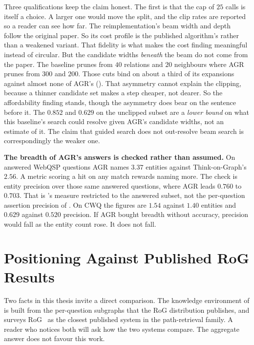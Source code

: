 Three qualifications keep the claim honest. The first is that the cap of $25$
calls is itself a choice. A larger one would move the split, and the clip rates
are reported so a reader can see how far. The reimplementation's beam width and
depth follow the original paper. So its cost profile is the published
algorithm's rather than a weakened variant. That fidelity is what makes the cost
finding meaningful instead of circular. But the candidate widths \emph{beneath}
the beam do not come from the paper. The baseline prunes from $40$ relations and
$20$ neighbours where AGR prunes from $300$ and $200$. Those cuts bind on about
a third of its expansions against almost none of AGR's
(). That asymmetry cannot explain the clipping, because a
thinner candidate set makes a step cheaper, not dearer. So the affordability
finding stands, though the asymmetry does bear on the sentence before it. The
$0.852$ and $0.629$ on the unclipped subset are a \emph{lower bound} on what
this baseline's search could resolve given AGR's candidate widths, not an
estimate of it. The claim that guided search does not out-resolve beam search is
correspondingly the weaker one.

\textbf{The breadth of AGR's answers is checked rather than assumed.} On
answered WebQSP questions AGR names $3.37$ entities against Think-on-Graph's
$2.56$. A metric scoring a hit on any match rewards naming more. The check is
entity precision over those same answered questions, where AGR leads $0.760$ to
$0.703$. That is 's measure restricted to the answered subset,
not the per-question assertion precision of . On CWQ the
figures are $1.54$ against $1.40$ entities and $0.629$ against $0.520$
precision. If AGR bought breadth without accuracy, precision would fall as the
entity count rose. It does not fall.

\section{Positioning Against Published RoG Results}\label{sec:rog-comparison}

Two facts in this thesis invite a direct comparison. The knowledge environment
of  is built from the per-question subgraphs
that the RoG distribution publishes, and  surveys
RoG~\cite{luo2024reasoning} as the closest published system in the
path-retrieval family. A reader who notices both will ask how the two systems
compare. The aggregate answer does not favour this work.

